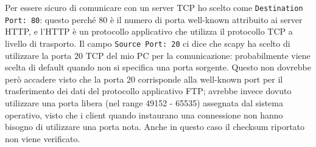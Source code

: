 \documentclass[12pt,a4paper]{report}
\begin{document}
Per essere sicuro di comunicare con un server TCP ho scelto come \texttt{Destination Port: 80}: questo perché 80 è il numero di porta well-known attribuito ai server HTTP, e l'HTTP è un protocollo applicativo che utilizza il protocollo TCP a livello di trasporto.
Il campo \texttt{Source Port: 20} ci dice che scapy ha scelto di utilizzare la porta 20 TCP del mio PC per la comunicazione: probabilmente viene scelta di default quando non si specifica una porta sorgente.
Questo non dovrebbe però accadere visto che la porta 20 corrisponde alla well-known port per il trasferimento dei dati del protocollo applicativo FTP; avrebbe invece dovuto utilizzare una porta libera (nel range 49152 - 65535) assegnata dal sistema operativo, visto che i client quando instaurano una connessione non hanno bisogno di utilizzare una porta nota. Anche in questo caso il checksum riportato non viene verificato.
\end{document}

